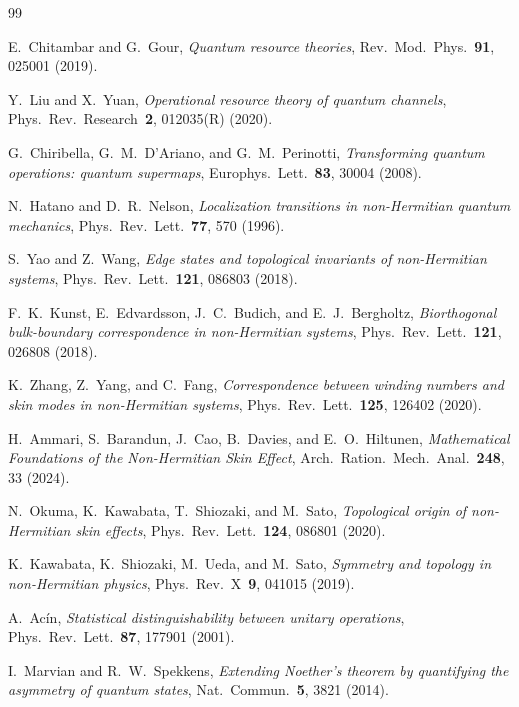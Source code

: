 \documentclass[reprint,amsmath,amssymb,aps,nofootinbib]{revtex4-2}
\begin{document}
\begin{thebibliography}{99}

E.~Chitambar and G.~Gour,
\textit{Quantum resource theories},
Rev.~Mod.~Phys.~\textbf{91}, 025001 (2019).

Y.~Liu and X.~Yuan,
\textit{Operational resource theory of quantum channels},
Phys.~Rev.~Research~\textbf{2}, 012035(R) (2020).

G.~Chiribella, G.~M.~D'Ariano, and G.~M.~Perinotti,
\textit{Transforming quantum operations: quantum supermaps},
Europhys.~Lett.~\textbf{83}, 30004 (2008).

N.~Hatano and D.~R.~Nelson,
\textit{Localization transitions in non-Hermitian quantum mechanics},
Phys.~Rev.~Lett.~\textbf{77}, 570 (1996).

S.~Yao and Z.~Wang,
\textit{Edge states and topological invariants of non-Hermitian systems},
Phys.~Rev.~Lett.~\textbf{121}, 086803 (2018).

F.~K.~Kunst, E.~Edvardsson, J.~C.~Budich, and E.~J.~Bergholtz,
\textit{Biorthogonal bulk-boundary correspondence in non-Hermitian systems},
Phys.~Rev.~Lett.~\textbf{121}, 026808 (2018).

K.~Zhang, Z.~Yang, and C.~Fang,
\textit{Correspondence between winding numbers and skin modes in non-Hermitian systems},
Phys.~Rev.~Lett.~\textbf{125}, 126402 (2020).

H.~Ammari, S.~Barandun, J.~Cao, B.~Davies, and E.~O.~Hiltunen,
\textit{Mathematical Foundations of the Non-Hermitian Skin Effect},
Arch.~Ration.~Mech.~Anal.~\textbf{248}, 33 (2024).

N.~Okuma, K.~Kawabata, T.~Shiozaki, and M.~Sato,
\textit{Topological origin of non-Hermitian skin effects},
Phys.~Rev.~Lett.~\textbf{124}, 086801 (2020).

K.~Kawabata, K.~Shiozaki, M.~Ueda, and M.~Sato,
\textit{Symmetry and topology in non-Hermitian physics},
Phys.~Rev.~X~\textbf{9}, 041015 (2019).

A.~Ac\'in,
\textit{Statistical distinguishability between unitary operations},
Phys.~Rev.~Lett.~\textbf{87}, 177901 (2001).

I.~Marvian and R.~W.~Spekkens,
\textit{Extending Noether's theorem by quantifying the asymmetry of quantum states},
Nat.~Commun.~\textbf{5}, 3821 (2014).


\end{thebibliography}
\end{document}

